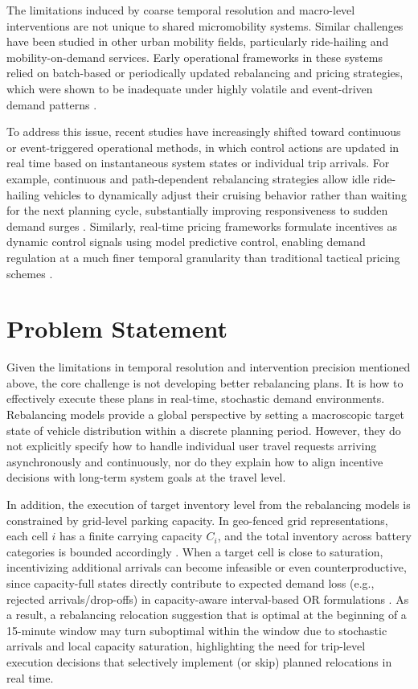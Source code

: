 The limitations induced by coarse temporal resolution and macro-level interventions are not unique to shared micromobility systems. Similar challenges have been studied in other urban mobility fields, particularly ride-hailing and mobility-on-demand services. Early operational frameworks in these systems relied on batch-based or periodically updated rebalancing and pricing strategies, which were shown to be inadequate under highly volatile and event-driven demand patterns \parencite{guo2021robust, neijmeijer2020}. 

To address this issue, recent studies have increasingly shifted toward continuous or event-triggered operational methods, in which control actions are updated in real time based on instantaneous system states or individual trip arrivals. For example, continuous and path-dependent rebalancing strategies allow idle ride-hailing vehicles to dynamically adjust their cruising behavior rather than waiting for the next planning cycle, substantially improving responsiveness to sudden demand surges \parencite{brar2025wise}. Similarly, real-time pricing frameworks formulate incentives as dynamic control signals using model predictive control, enabling demand regulation at a much finer temporal granularity than traditional tactical pricing schemes \parencite{yuan2021real, yuan2021learning}. 

\section{Problem Statement}

Given the limitations in temporal resolution and intervention precision mentioned above, the core challenge is not developing better rebalancing plans. It is how to effectively execute these plans in real-time, stochastic demand environments. Rebalancing models provide a global perspective by setting a macroscopic target state of vehicle distribution within a discrete planning period. However, they do not explicitly specify how to handle individual user travel requests arriving asynchronously and continuously, nor do they explain how to align incentive decisions with long-term system goals at the travel level.

In addition, the execution of target inventory level from the rebalancing models is constrained by grid-level parking capacity. 
In geo-fenced grid representations, each cell $i$ has a finite carrying capacity $C_i$, and the 
total inventory across battery categories is bounded accordingly \parencite{momen2025}. 
When a target cell is close to saturation, incentivizing additional arrivals can become infeasible 
or even counterproductive, since capacity-full states directly contribute to expected demand loss 
(e.g., rejected arrivals/drop-offs) in capacity-aware interval-based OR formulations \parencite{momen2025}. 
As a result, a rebalancing relocation suggestion that is optimal at the beginning of a 15-minute window 
may turn suboptimal within the window due to stochastic arrivals and local capacity saturation, 
highlighting the need for trip-level execution decisions that selectively implement (or skip) 
planned relocations in real time.

